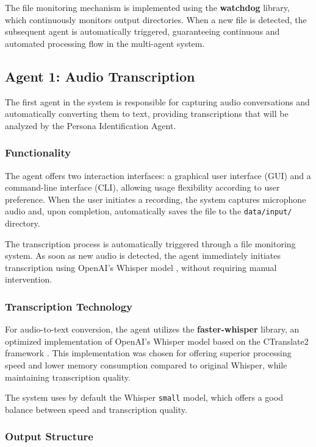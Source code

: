 \documentclass[12pt]{article}
\begin{document}
The file monitoring mechanism is implemented using the \textbf{watchdog} library, which continuously monitors output directories. When a new file is detected, the subsequent agent is automatically triggered, guaranteeing continuous and automated processing flow in the multi-agent system.


\subsection{Agent 1: Audio Transcription}
\label{sec:agent1}

The first agent in the system is responsible for capturing audio conversations and automatically converting them to text, providing transcriptions that will be analyzed by the Persona Identification Agent.

\subsubsection{Functionality}

The agent offers two interaction interfaces: a graphical user interface (GUI) and a command-line interface (CLI), allowing usage flexibility according to user preference. When the user initiates a recording, the system captures microphone audio and, upon completion, automatically saves the file to the \texttt{data/input/} directory.

The transcription process is automatically triggered through a file monitoring system. As soon as new audio is detected, the agent immediately initiates transcription using OpenAI's Whisper model \cite{whisper2022}, without requiring manual intervention.

\subsubsection{Transcription Technology}

For audio-to-text conversion, the agent utilizes the \textbf{faster-whisper} library, an optimized implementation of OpenAI's Whisper model based on the CTranslate2 framework \cite{ctranslate2}. This implementation was chosen for offering superior processing speed and lower memory consumption compared to original Whisper, while maintaining transcription quality.

The system uses by default the Whisper \texttt{small} model, which offers a good balance between speed and transcription quality.

\subsubsection{Output Structure}
\end{document}
